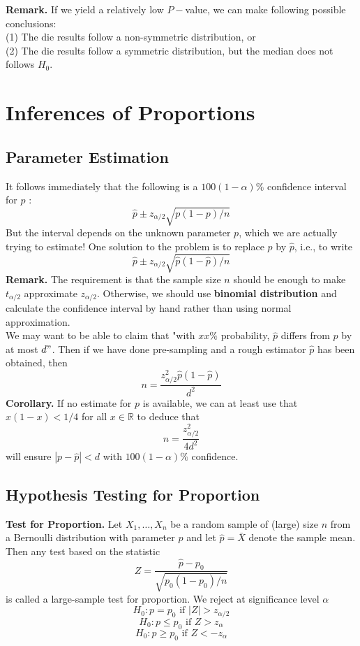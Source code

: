 \documentclass[a4paper,12pt]{article}
\begin{document}
\noindent \textbf{Remark.} If we yield a relatively low $P-$value, we can make following possible conclusions:\\
(1) The die results follow a non-symmetric distribution, or\\
(2) The die results follow a symmetric distribution, but the median does not follows $H_0$.



\section{Inferences of Proportions}
\subsection{Parameter Estimation}
It follows immediately that the following is a $100(1-\alpha) \%$ confidence interval for $p$ :
$$
\widehat{p} \pm z_{\alpha / 2} \sqrt{p(1-p) / n}
$$
But the interval depends on the unknown parameter $p$, which we are actually trying to estimate! One solution to the problem is to replace $p$ by $\widehat{p}$, i.e., to write
\begin{equation}
\widehat{p} \pm z_{\alpha / 2} \sqrt{\widehat{p}(1-\widehat{p}) / n}
\end{equation}
\textbf{Remark.} The requirement is that the sample size $n$ should be enough to make $t_{\alpha/2}$ approximate $z_{\alpha/2}$. Otherwise, we should use \textbf{binomial distribution} and calculate the confidence interval by hand rather than using normal approximation.\\

\noindent We may want to be able to claim that "with $x x \%$ probability, $\hat{p}$ differs from $p$ by at most $d"$. Then if we have done pre-sampling and a rough estimator $\hat{p}$ has been obtained, then
\begin{equation}
    n=\frac{z_{\alpha / 2}^2 \widehat{p}(1-\widehat{p})}{d^2}
\end{equation}
\textbf{Corollary.} If no estimate for $p$ is available, we can at least use that $x(1-x)<1 / 4$ for all $x \in \mathbb{R}$ to deduce that
\begin{equation}
n=\frac{z_{\alpha / 2}^2}{4 d^2}
\end{equation}
will ensure $|p-\widehat{p}|<d$ with $100(1-\alpha) \%$ confidence.
\subsection{Hypothesis Testing for Proportion}
\textbf{Test for Proportion.} Let $X_1, \ldots, X_n$ be a random sample of (large) size $n$ from a Bernoulli distribution with parameter $p$ and let $\widehat{p}=\bar{X}$ denote the sample mean. Then any test based on the statistic
$$
Z=\frac{\widehat{p}-p_0}{\sqrt{p_0\left(1-p_0\right) / n}}
$$
is called a large-sample test for proportion. We reject at significance level $\alpha$
$$H_0: p=p_0 \text{ if } |Z|>z_{\alpha / 2}$$
$$H_0: p \leq p_0\text{ if }Z>z_\alpha$$
$$H_0: p \geq p_0\text{ if }Z<-z_\alpha$$
\end{document}
